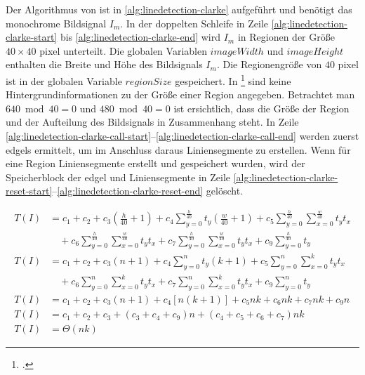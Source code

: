 Der Algorithmus von \citeauthor{clarke96} ist in \autoref{alg:linedetection-clarke} aufgeführt und benötigt das
 monochrome Bildsignal $I_m$. In der doppelten Schleife in Zeile \ref{alg:linedetection-clarke-start} bis
 \ref{alg:linedetection-clarke-end} wird $I_m$ in Regionen der Größe $40 \times 40$ \gls{pixel} unterteilt. Die
 globalen Variablen $\mathit{imageWidth}$ und $\mathit{imageHeight}$ enthalten die Breite und Höhe des Bildsignals
 $I_m$. Die Regionengröße von $40$ \gls{pixel} ist in der globalen Variable $\mathit{regionSize}$ gespeichert. In
 \citeauthor{clarke96}\footcite{clarke96} sind keine Hintergrundinformationen zu der Größe einer Region angegeben.
 Betrachtet man $640 \bmod 40 = 0$ und $480 \bmod 40 = 0$ ist ersichtlich, dass die Größe der Region und der Aufteilung
 des Bildsignals in Zusammenhang steht. In Zeile
 \ref{alg:linedetection-clarke-call-start}--\ref{alg:linedetection-clarke-call-end} werden zuerst \glspl{edgel}
 ermittelt, um im Anschluss daraus Liniensegmente zu erstellen. Wenn für eine Region Liniensegmente erstellt und
 gespeichert wurden, wird der Speicherblock der \gls{edgel} und Liniensegmente in Zeile
 \ref{alg:linedetection-clarke-reset-start}--\ref{alg:linedetection-clarke-reset-end} gelöscht.



\begin{subequations}
\begin{align}
\label{eq:linedetection-analyze1}
T(I)& =
c_1
+ c_2
+ c_3 \left(\frac{h}{40} + 1\right)
+ c_4 \sum \limits_{y = 0}^{\frac{h}{40}} t_y \left(\frac{w}{40} + 1 \right)
+ c_5 \sum \limits_{y = 0}^{\frac{h}{40}} \sum \limits_{x = 0}^{\frac{w}{40}} t_y t_x\\
& \quad + c_6 \sum \limits_{y = 0}^{\frac{h}{40}} \sum \limits_{x = 0}^{\frac{w}{40}} t_y t_x
+ c_7 \sum \limits_{y = 0}^{\frac{h}{40}} \sum \limits_{x = 0}^{\frac{w}{40}} t_y t_x
+ c_9 \sum \limits_{y = 0}^{\frac{h}{40}} t_y \nonumber \\
\label{eq:linedetection-analyze2}
T(I)& =
c_1
+ c_2
+ c_3 \left(n + 1\right)
+ c_4 \sum \limits_{y = 0}^{n} t_y \left(k + 1 \right)
+ c_5 \sum \limits_{y = 0}^{n} \sum \limits_{x = 0}^{k} t_y t_x\\
& \quad + c_6 \sum \limits_{y = 0}^{n} \sum \limits_{x = 0}^{k} t_y t_x
+ c_7 \sum \limits_{y = 0}^{n} \sum \limits_{x = 0}^{k} t_y t_x
+ c_9 \sum \limits_{y = 0}^{n} t_y \nonumber \\
\label{eq:linedetection-analyze3}
T(I)& =
c_1
+ c_2
+ c_3 \left(n + 1\right)
+ c_4 \left[n \left(k + 1 \right)\right]
+ c_5 n k
+ c_6 n k
+ c_7 n k
+ c_9 n\\
\label{eq:linedetection-analyze4}
T(I)& = c_1 + c_2 + c_3 + \left(c_3 + c_4 + c_9\right) n + \left(c_4 + c_5 + c_6 + c_7\right) n k\\
\label{eq:linedetection-analyze5}
T(I)& = \Theta(nk)
\end{align}
\end{subequations}

